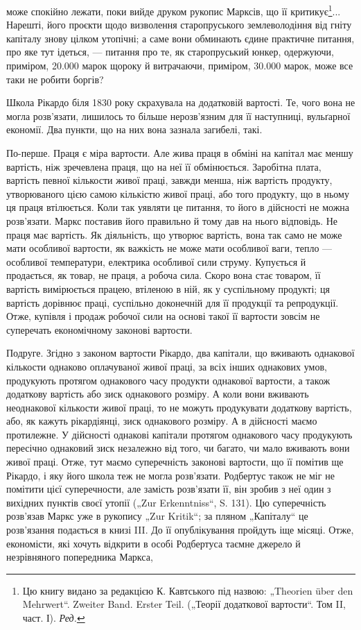 \parcont{}  %
може спокійно лежати, поки вийде друком рукопис Марксів, що її критикує\footnote*{
Цю книгу видано за редакцією К. Кавтського під назвою: „Theorien über den Mehrwert“. Zweiter
Band. Erster Teil. („Теорії додаткової вартости“. Том II, част. І). \emph{Ред.}
}... Нарешті, його проєкти
щодо визволення старопруського землеволодіння від гніту капіталу знову цілком утопічні; а саме вони
обминають єдине практичне питання, про яке тут ідеться, — питання про те, як старопруський юнкер,
одержуючи, приміром, 20.000 марок щороку й витрачаючи, приміром, 30.000 марок, може все таки не
робити боргів?

Школа Рікардо біля 1830 року скрахувала на додатковій вартості. Те, чого вона не могла розв’язати,
лишилось то більше нерозв’язним для її наступниці, вульґарної економії. Два пункти, що на них вона
зазнала загибелі, такі.

По-перше. Праця є міра вартости. Але жива праця в обміні на капітал має меншу вартість, ніж
зречевлена праця, що на неї її обмінюється. Заробітна плата, вартість певної кількости живої праці,
завжди менша, ніж вартість продукту, утворюваного цією самою кількістю живої праці, або того
продукту, що в ньому ця праця втілюється. Коли
так уявляти це питання, то його в дійсності не можна розв’язати. Маркс поставив його правильно й
тому дав на нього відповідь. Не праця має вартість. Як діяльність, що утворює вартість, вона так
само не може мати особливої вартости, як важкість не може мати особливої ваги, тепло — особливої
температури, електрика особливої сили струму. Купується й продається, як товар, не праця, а робоча
сила. Скоро вона стає товаром, її вартість вимірюється працею, втіленою в ній, як у суспільному
продукті; ця вартість дорівнює праці, суспільно доконечній для її продукції та репродукції. Отже,
купівля і продаж робочої сили на основі такої її вартости зовсім не суперечать економічному законові
вартости.

Подруге. Згідно з законом вартости Рікардо, два капітали, що вживають однакової кількости однаково
оплачуваної живої праці, за всіх інших однакових умов, продукують протягом однакового часу продукти
однакової вартости, а також додаткову вартість або зиск однакового розміру. А коли вони вживають
неоднакової кількости живої праці, то не можуть продукувати додаткову вартість, або, як кажуть
рікардіянці, зиск однакового розміру. А в дійсності маємо протилежне. У дійсності однакові
капітали протягом однакового часу продукують пересічно однаковий зиск незалежно від того, чи багато,
чи мало вживають вони живої праці. Отже, тут маємо суперечність законові вартости, що її помітив ще
Рікардо, і яку його школа теж не могла розв’язати. Родбертус також не міг не помітити цієї
суперечности, але замість розв’язати її, він зробив з неї один з вихідних пунктів своєї утопії („Zur
Erkenntniss“, S. 131). Цю суперечність розв’язав Маркс уже в рукопису „Zur Kritik“; за пляном
„Капіталу“ це розв’язання подається в книзі III. До її опублікування пройдуть іще місяці. Отже,
економісти, які хочуть відкрити в особі Родбертуса таємне джерело й незрівняного попередника Маркса,
\parbreak{}  %
